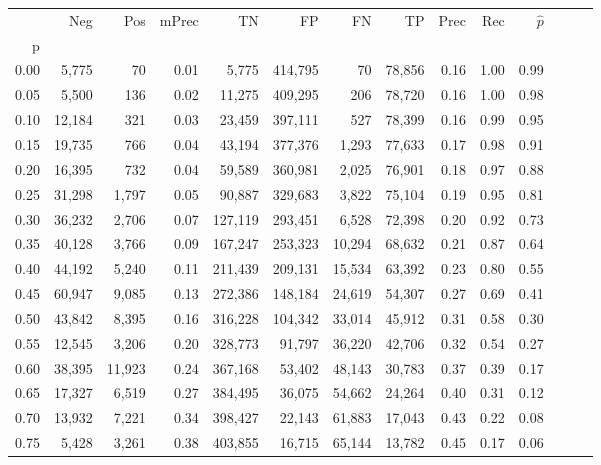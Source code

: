 \begin{tabular}{rrrrrrrrrrrrrr}
\toprule
{} &     Neg &     Pos & mPrec &       TN &       FP &      FN &      TP &  Prec &   Rec & $\hat{p}$ \\
p    &         &         &       &          &          &         &         &       &       &           \\
\midrule
0.00 &   5,775 &      70 &  0.01 &    5,775 &  414,795 &      70 &  78,856 &  0.16 &  1.00 &      0.99 \\
0.05 &   5,500 &     136 &  0.02 &   11,275 &  409,295 &     206 &  78,720 &  0.16 &  1.00 &      0.98 \\
0.10 &  12,184 &     321 &  0.03 &   23,459 &  397,111 &     527 &  78,399 &  0.16 &  0.99 &      0.95 \\
0.15 &  19,735 &     766 &  0.04 &   43,194 &  377,376 &   1,293 &  77,633 &  0.17 &  0.98 &      0.91 \\
0.20 &  16,395 &     732 &  0.04 &   59,589 &  360,981 &   2,025 &  76,901 &  0.18 &  0.97 &      0.88 \\
0.25 &  31,298 &   1,797 &  0.05 &   90,887 &  329,683 &   3,822 &  75,104 &  0.19 &  0.95 &      0.81 \\
0.30 &  36,232 &   2,706 &  0.07 &  127,119 &  293,451 &   6,528 &  72,398 &  0.20 &  0.92 &      0.73 \\
0.35 &  40,128 &   3,766 &  0.09 &  167,247 &  253,323 &  10,294 &  68,632 &  0.21 &  0.87 &      0.64 \\
0.40 &  44,192 &   5,240 &  0.11 &  211,439 &  209,131 &  15,534 &  63,392 &  0.23 &  0.80 &      0.55 \\
0.45 &  60,947 &   9,085 &  0.13 &  272,386 &  148,184 &  24,619 &  54,307 &  0.27 &  0.69 &      0.41 \\
0.50 &  43,842 &   8,395 &  0.16 &  316,228 &  104,342 &  33,014 &  45,912 &  0.31 &  0.58 &      0.30 \\
0.55 &  12,545 &   3,206 &  0.20 &  328,773 &   91,797 &  36,220 &  42,706 &  0.32 &  0.54 &      0.27 \\
0.60 &  38,395 &  11,923 &  0.24 &  367,168 &   53,402 &  48,143 &  30,783 &  0.37 &  0.39 &      0.17 \\
0.65 &  17,327 &   6,519 &  0.27 &  384,495 &   36,075 &  54,662 &  24,264 &  0.40 &  0.31 &      0.12 \\
0.70 &  13,932 &   7,221 &  0.34 &  398,427 &   22,143 &  61,883 &  17,043 &  0.43 &  0.22 &      0.08 \\
0.75 &   5,428 &   3,261 &  0.38 &  403,855 &   16,715 &  65,144 &  13,782 &  0.45 &  0.17 &      0.06 \\

\end{tabular}
